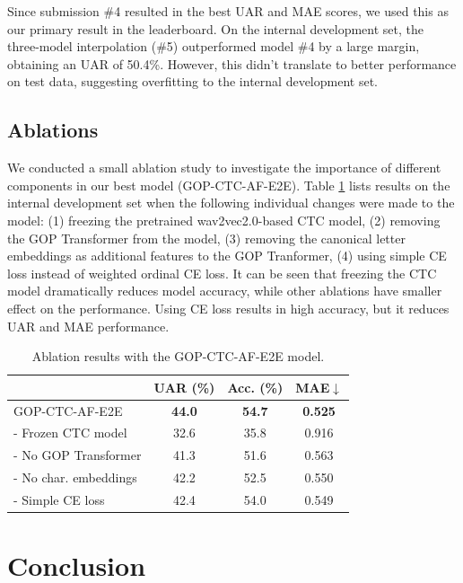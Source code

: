 \documentclass{article}
\begin{document}
Since submission \#4 resulted in the best UAR and MAE scores, we used this as our primary result in the leaderboard. On the internal development set, the three-model interpolation (\#5) outperformed model \#4  by a large margin, obtaining an UAR of 50.4\%. However, this didn't translate to better performance on test data, suggesting overfitting to the internal development set.

\subsection{Ablations}

We conducted a small ablation study to investigate the importance of different components in our best model (GOP-CTC-AF-E2E). Table \ref{tab:ablation} lists results on the internal development set when the following individual changes were made to the model: (1) freezing the pretrained wav2vec2.0-based CTC model, (2) removing the GOP Transformer from the model, (3) removing the canonical letter embeddings as additional features to the GOP Tranformer, (4) using simple CE loss instead of weighted ordinal CE loss. It can be seen that freezing the CTC model dramatically reduces model accuracy, while other ablations have smaller effect on the performance. Using CE loss results in high accuracy, but it reduces UAR and MAE performance.

\begin{table}[tb]
\centering
\label{tab:ablation}
\caption{Ablation results with the GOP-CTC-AF-E2E model.}
\begin{tabular}{l|ccc}
\toprule
                              & UAR  (\%) & Acc. (\%) & MAE$\downarrow$   \\ \midrule
GOP-CTC-AF-E2E    & \textbf{44.0}       &\textbf{54.7}          & \textbf{0.525}     \\ \midrule
- Frozen CTC model & 32.6      & 35.8 & 0.916 \\
- No GOP Transformer & 41.3 & 51.6 & 0.563 \\
- No char. embeddings & 42.2 & 52.5 & 0.550 \\
- Simple CE loss & 42.4 & 54.0 & 0.549 \\ \bottomrule
\end{tabular}
\end{table}

\section{Conclusion}
\end{document}
